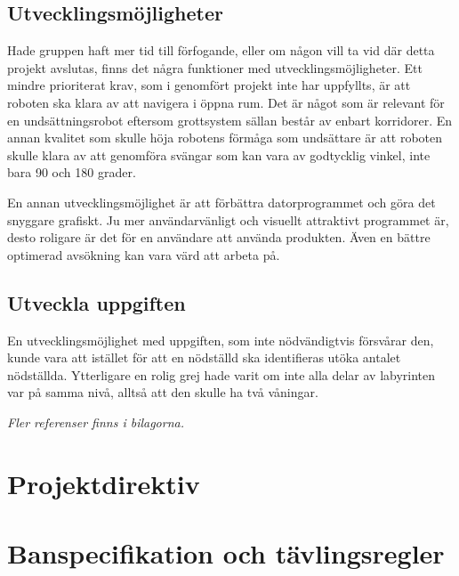 \documentclass[11pt]{article}
\begin{document}
\begin{flushleft}
\subsection{Utvecklingsmöjligheter}
Hade gruppen haft mer tid till förfogande, eller om någon vill ta vid där detta projekt avslutas, finns det några funktioner med utvecklingsmöjligheter. Ett mindre prioriterat krav, som i genomfört projekt inte har uppfyllts, är att roboten ska klara av att navigera i öppna rum. Det är något som är relevant för en undsättningsrobot eftersom grottsystem sällan består av enbart korridorer. En annan kvalitet som skulle höja robotens förmåga som undsättare är att roboten skulle klara av att genomföra svängar som kan vara av godtycklig vinkel, inte bara 90 och 180 grader. 

En annan utvecklingsmöjlighet är att förbättra datorprogrammet och göra det snyggare grafiskt. Ju mer användarvänligt och visuellt attraktivt programmet är, desto roligare är det för en användare att använda produkten. Även en bättre optimerad avsökning kan vara värd att arbeta på.

\subsection{Utveckla uppgiften}
En utvecklingsmöjlighet med uppgiften, som inte nödvändigtvis försvårar den, kunde vara att istället för att en nödställd ska identifieras utöka antalet nödställda. Ytterligare en rolig grej hade varit om inte alla delar av labyrinten var på samma nivå, alltså att den skulle ha två våningar. 

\pagebreak




\textit{Fler referenser finns i bilagorna.}

\pagebreak


\appendix

\end{flushleft}


\newpage
\appendix
\section{Projektdirektiv}


\section{Banspecifikation och tävlingsregler}

\end{document}
